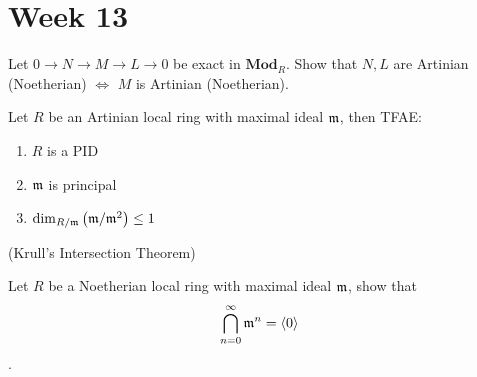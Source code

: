 
\section{Week 13}

\begin{exercise}
  Let $0 \to N \to M \to L \to 0$ be exact in $\mathbf{Mod}_R$.
  Show that $N, L$ are Artinian (Noetherian) $\iff$ $M$ is Artinian (Noetherian).
\end{exercise}

\begin{exercise}
  Let $R$ be an Artinian local ring with maximal ideal $\mathfrak{m}$, 
  then TFAE:
  \begin{enumerate}
    \item $R$ is a PID
    \item $\mathfrak{m}$ is principal
    \item $\dim_{R/\mathfrak{m}} \left( \mathfrak{m}/\mathfrak{m}^2 \right) \leq 1$
  \end{enumerate}
\end{exercise}

\begin{exercise}{(Krull's Intersection Theorem)}

  Let $R$ be a Noetherian local ring with maximal ideal $\mathfrak{m}$, 
  show that $$\bigcap\limits_{n=0}^{\infty} \mathfrak{m}^n = \langle0\rangle$$.
\end{exercise}
